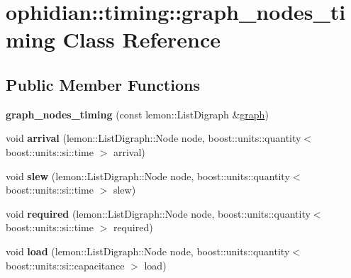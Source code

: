 \hypertarget{classophidian_1_1timing_1_1graph__nodes__timing}{\section{ophidian\-:\-:timing\-:\-:graph\-\_\-nodes\-\_\-timing Class Reference}
\label{classophidian_1_1timing_1_1graph__nodes__timing}
}
\subsection*{Public Member Functions}
\begin{DoxyCompactItemize}
\item 
\hypertarget{classophidian_1_1timing_1_1graph__nodes__timing_a4b1b4507fd5216cd1c89f0aa7df05c2b}{{\bfseries graph\-\_\-nodes\-\_\-timing} (const lemon\-::\-List\-Digraph \&\hyperlink{classophidian_1_1timing_1_1graph}{graph})}\label{classophidian_1_1timing_1_1graph__nodes__timing_a4b1b4507fd5216cd1c89f0aa7df05c2b}

\item 
\hypertarget{classophidian_1_1timing_1_1graph__nodes__timing_a4f4e60f56bb09f477b26db86496f4069}{void {\bfseries arrival} (lemon\-::\-List\-Digraph\-::\-Node node, boost\-::units\-::quantity$<$ boost\-::units\-::si\-::time $>$ arrival)}\label{classophidian_1_1timing_1_1graph__nodes__timing_a4f4e60f56bb09f477b26db86496f4069}

\item 
\hypertarget{classophidian_1_1timing_1_1graph__nodes__timing_aa31b0124ffe6e8f8047c9ec5dd686044}{void {\bfseries slew} (lemon\-::\-List\-Digraph\-::\-Node node, boost\-::units\-::quantity$<$ boost\-::units\-::si\-::time $>$ slew)}\label{classophidian_1_1timing_1_1graph__nodes__timing_aa31b0124ffe6e8f8047c9ec5dd686044}

\item 
\hypertarget{classophidian_1_1timing_1_1graph__nodes__timing_af727fe6ce2099dfa38d4d343ab34e383}{void {\bfseries required} (lemon\-::\-List\-Digraph\-::\-Node node, boost\-::units\-::quantity$<$ boost\-::units\-::si\-::time $>$ required)}\label{classophidian_1_1timing_1_1graph__nodes__timing_af727fe6ce2099dfa38d4d343ab34e383}

\item 
\hypertarget{classophidian_1_1timing_1_1graph__nodes__timing_aac025e5ea2d7ec6a98502d47f7d4f3fd}{void {\bfseries load} (lemon\-::\-List\-Digraph\-::\-Node node, boost\-::units\-::quantity$<$ boost\-::units\-::si\-::capacitance $>$ load)}\label{classophidian_1_1timing_1_1graph__nodes__timing_aac025e5ea2d7ec6a98502d47f7d4f3fd}


\end{DoxyCompactItemize}
